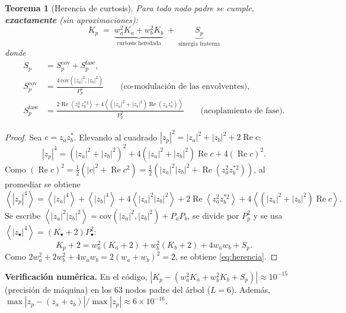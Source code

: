 \documentclass[11pt,a4paper]{article}
\newtheorem{teorema}{Teorema}
\theoremstyle{definition}
\theoremstyle{remark}
\newcommand{\ip}[1]{\left\langle #1 \right\rangle}
\renewcommand{\Re}{\operatorname{Re}}
\begin{document}
\begin{teorema}[Herencia de curtosis]\label{teo:herencia}
Para todo nodo padre se cumple, \textbf{exactamente} (sin aproximaciones):
\begin{equation}\label{eq:herencia}
\boxed{\;K_p \;=\; \underbrace{w_a^2K_a+w_b^2K_b}_{\text{curtosis heredada}}\;+\;\underbrace{S_p}_{\text{sinergia fraterna}}\;}
\end{equation}
donde
\begin{align}
S_p &= S^{\mathrm{cov}}_p+S^{\mathrm{fase}}_p,\\
S^{\mathrm{cov}}_p &= \frac{4\,\mathrm{cov}\!\left(|z_a|^2,|z_b|^2\right)}{P_p^2}
      \qquad\text{(co-modulación de las envolventes)},\label{eq:scov}\\
S^{\mathrm{fase}}_p &= \frac{2\Re\ip{z_a^2\,z_b^{*2}}+4\ip{\left(|z_a|^2+|z_b|^2\right)\Re(z_az_b^*)}}{P_p^2}
      \qquad\text{(acoplamiento de fase)}.\label{eq:sfase}
\end{align}
\end{teorema}
\begin{proof}
Sea $c=z_az_b^*$. Elevando al cuadrado $|z_p|^2=|z_a|^2+|z_b|^2+2\Re c$:
\[
|z_p|^4=(|z_a|^2+|z_b|^2)^2+4(|z_a|^2+|z_b|^2)\Re c+4(\Re c)^2 .
\]
Como $(\Re c)^2=\tfrac12\left(|c|^2+\Re c^2\right)=\tfrac12\left(|z_a|^2|z_b|^2+\Re(z_a^2z_b^{*2})\right)$, al promediar se obtiene
\[
\ip{|z_p|^4}=\ip{|z_a|^4}+\ip{|z_b|^4}+4\ip{|z_a|^2|z_b|^2}+2\Re\ip{z_a^2z_b^{*2}}+4\ip{(|z_a|^2+|z_b|^2)\Re c}.
\]
Se escribe $\ip{|z_a|^2|z_b|^2}=\mathrm{cov}(|z_a|^2,|z_b|^2)+P_aP_b$, se divide por $P_p^2$ y se usa $\ip{|z_\bullet|^4}=(K_\bullet+2)P_\bullet^2$:
\[
K_p+2=w_a^2(K_a+2)+w_b^2(K_b+2)+4w_aw_b+S_p .
\]
Como $2w_a^2+2w_b^2+4w_aw_b=2(w_a+w_b)^2=2$, se obtiene \eqref{eq:herencia}.
\end{proof}

\noindent\textbf{Verificación numérica.} En el código, $|K_p-(w_a^2K_a+w_b^2K_b+S_p)|\approx10^{-15}$ (precisión de máquina) en los 63 nodos padre del árbol ($L=6$). Además, $\max|z_p-(z_a+z_b)|/\max|z_p|\approx6\times10^{-16}$.
\end{document}
